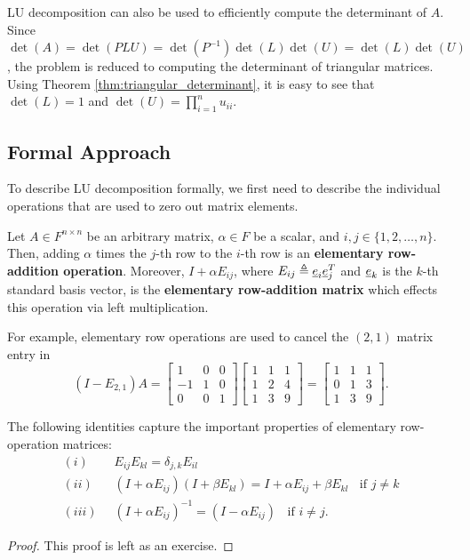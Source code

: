 LU decomposition can also be used to efficiently compute the determinant of $A$.
Since $\det(A) = \det(PLU) = \det(P^{-1}) \det(L) \det(U) = \det(L) \det(U)$, the problem is reduced to computing the determinant of triangular matrices.
Using Theorem \ref{thm:triangular_determinant}, it is easy to see that $\det(L) = 1$ and $\det(U) = \prod_{i=1}^n u_{ii}$.

\subsection{Formal Approach}

To describe LU decomposition formally, we first need to describe the individual operations that are used to zero out matrix elements.
\begin{definition}
Let $A \in F^{n\times n}$ be an arbitrary matrix, $\alpha \in F$ be a scalar, and $i,j\in \{1,2,\ldots,n\}$.
Then, adding $\alpha$ times the $j$-th row to the $i$-th row is an \textbf{elementary row-addition operation}.
Moreover, $I + \alpha E_{ij}$, where $E_{ij} \triangleq \underline{e}_i \underline{e}_j^T$ and $\underline{e}_k$ is the $k$-th standard basis vector, is the \textbf{elementary row-addition matrix} which effects this operation via left multiplication.
\end{definition}

\begin{example}
For example, elementary row operations are used to cancel the $(2,1)$ matrix entry in
\begin{equation*}
(I - E_{2,1}) A
= \begin{bmatrix} 1 & 0 & 0 \\ -1 & 1 & 0 \\ 0 & 0 & 1 \end{bmatrix}
\begin{bmatrix} 1 & 1 & 1 \\ 1 & 2 & 4 \\ 1 & 3 & 9 \end{bmatrix}
= \begin{bmatrix} 1 & 1 & 1 \\ 0 & 1 & 3 \\ 1 & 3 & 9 \end{bmatrix} .
\end{equation*}
\end{example}

\begin{lemma}
\label{lem:elem_row_mat}
The following identities capture the important properties of elementary row-operation matrices:
\begin{align*}
(i) & \;\; E_{ij} E_{kl} = \delta_{j,k} E_{il} \\
(ii) & \;\; (I + \alpha E_{ij}) (I + \beta E_{kl}) = I + \alpha E_{ij} + \beta E_{kl} \;\; \textrm{ if } j \neq k \\
(iii) & \;\; (I+ \alpha E_{ij})^{-1} = (I-\alpha E_{ij}) \;\; \textrm{ if } i \neq j. 
\end{align*}
\end{lemma}
\begin{proof}
This proof is left as an exercise.
\end{proof}

